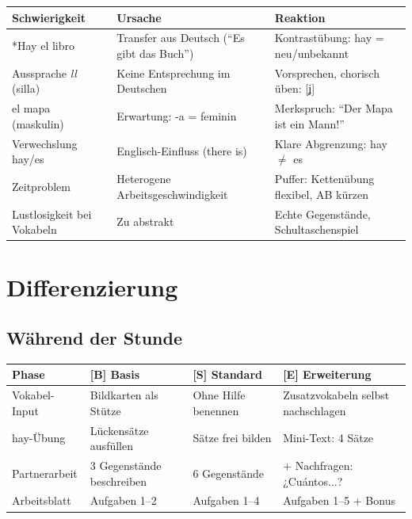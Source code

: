 \documentclass[11pt,a4paper]{article}
\begin{document}
\begin{tabular}{|p{4.5cm}|p{4.5cm}|p{4.5cm}|}
\hline
\textbf{Schwierigkeit} & \textbf{Ursache} & \textbf{Reaktion} \\
\hline
*Hay el libro & Transfer aus Deutsch (``Es gibt das Buch'') & Kontrastübung: hay = neu/unbekannt \\
\hline
Aussprache \textit{ll} (silla) & Keine Entsprechung im Deutschen & Vorsprechen, chorisch üben: [ʝ] \\
\hline
el mapa (maskulin) & Erwartung: -a = feminin & Merkspruch: ``Der Mapa ist ein Mann!'' \\
\hline
Verwechslung hay/es & Englisch-Einfluss (there is) & Klare Abgrenzung: hay $\neq$ es \\
\hline
Zeitproblem & Heterogene Arbeitsgeschwindigkeit & Puffer: Kettenübung flexibel, AB kürzen \\
\hline
Lustlosigkeit bei Vokabeln & Zu abstrakt & Echte Gegenstände, Schultaschenspiel \\
\hline
\end{tabular}

\section{Differenzierung}

\subsection{Während der Stunde}

\begin{tabular}{|l|p{4cm}|p{4cm}|p{4cm}|}
\hline
\textbf{Phase} & \textbf{[B] Basis} & \textbf{[S] Standard} & \textbf{[E] Erweiterung} \\
\hline
Vokabel-Input & Bildkarten als Stütze & Ohne Hilfe benennen & Zusatzvokabeln selbst nachschlagen \\
\hline
hay-Übung & Lückensätze ausfüllen & Sätze frei bilden & Mini-Text: 4 Sätze \\
\hline
Partnerarbeit & 3 Gegenstände beschreiben & 6 Gegenstände & + Nachfragen: ¿Cuántos...? \\
\hline
Arbeitsblatt & Aufgaben 1--2 & Aufgaben 1--4 & Aufgaben 1--5 + Bonus \\
\hline
\end{tabular}
\end{document}
